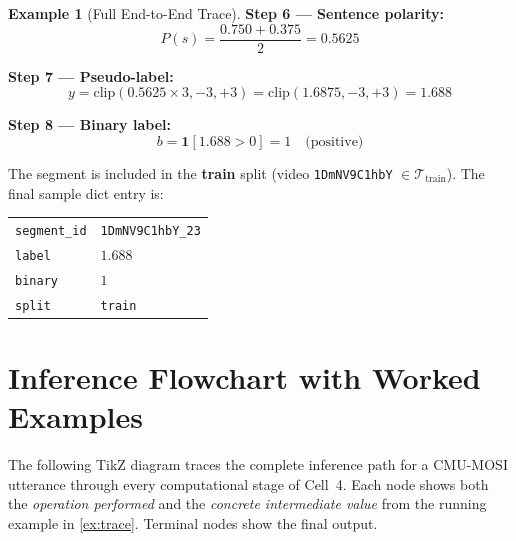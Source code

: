 \documentclass[12pt,a4paper]{article}
\theoremstyle{plain}
\theoremstyle{definition}
\newtheorem{example}[theorem]{Example}
\begin{document}
\begin{example}[Full End-to-End Trace]
  \textbf{Step 6 — Sentence polarity:}
  \[
    P(s) = \frac{0.750 + 0.375}{2} = 0.5625
  \]

  \textbf{Step 7 — Pseudo-label:}
  \[
    y = \text{clip}(0.5625 \times 3, -3, +3)
      = \text{clip}(1.6875, -3, +3) = 1.688
  \]

  \textbf{Step 8 — Binary label:}
  \[
    b = \mathbf{1}[1.688 > 0] = 1 \quad \text{(positive)}
  \]

  The segment is included in the \textbf{train} split
  (video \texttt{1DmNV9C1hbY} $\in \mathcal{T}_\text{train}$).
  The final sample dict entry is:
  \begin{center}
    \small
    \begin{tabular}{ll}
      \texttt{segment\_id} & \texttt{1DmNV9C1hbY\_23} \\
      \texttt{label}       & $1.688$ \\
      \texttt{binary}      & $1$ \\
      \texttt{split}       & \texttt{train} \\
    \end{tabular}
  \end{center}
\end{example}

\section{Inference Flowchart with Worked Examples}
\label{sec:flowchart}

The following TikZ diagram traces the complete inference path for a
CMU-MOSI utterance through every computational stage of Cell~4.
Each node shows both the \emph{operation performed} and the
\emph{concrete intermediate value} from the running example
in \cref{ex:trace}.  Terminal nodes show the final output.
\end{document}
